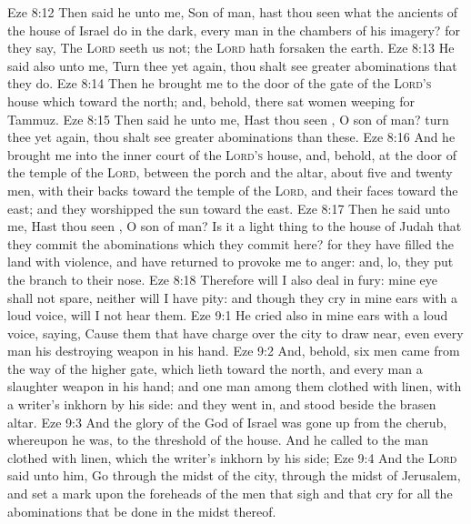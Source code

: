 \vs Eze 8:12 Then said he unto me, Son of man, hast thou seen what the ancients of the house of Israel do in the dark, every man in the chambers of his imagery? for they say, The \textsc{Lord} seeth us not; the \textsc{Lord} hath forsaken the earth.
\vs Eze 8:13 He said also unto me, Turn thee yet again,  thou shalt see greater abominations that they do.
\vs Eze 8:14 Then he brought me to the door of the gate of the \textsc{Lord's} house which  toward the north; and, behold, there sat women weeping for Tammuz.
\vs Eze 8:15 Then said he unto me, Hast thou seen , O son of man? turn thee yet again,  thou shalt see greater abominations than these.
\vs Eze 8:16 And he brought me into the inner court of the \textsc{Lord's} house, and, behold, at the door of the temple of the \textsc{Lord}, between the porch and the altar,  about five and twenty men, with their backs toward the temple of the \textsc{Lord}, and their faces toward the east; and they worshipped the sun toward the east.
\vs Eze 8:17 Then he said unto me, Hast thou seen , O son of man? Is it a light thing to the house of Judah that they commit the abominations which they commit here? for they have filled the land with violence, and have returned to provoke me to anger: and, lo, they put the branch to their nose.
\vs Eze 8:18 Therefore will I also deal in fury: mine eye shall not spare, neither will I have pity: and though they cry in mine ears with a loud voice,  will I not hear them.
\vs Eze 9:1 He cried also in mine ears with a loud voice, saying, Cause them that have charge over the city to draw near, even every man  his destroying weapon in his hand.
\vs Eze 9:2 And, behold, six men came from the way of the higher gate, which lieth toward the north, and every man a slaughter weapon in his hand; and one man among them  clothed with linen, with a writer's inkhorn by his side: and they went in, and stood beside the brasen altar.
\vs Eze 9:3 And the glory of the God of Israel was gone up from the cherub, whereupon he was, to the threshold of the house. And he called to the man clothed with linen, which  the writer's inkhorn by his side;
\vs Eze 9:4 And the \textsc{Lord} said unto him, Go through the midst of the city, through the midst of Jerusalem, and set a mark upon the foreheads of the men that sigh and that cry for all the abominations that be done in the midst thereof.
